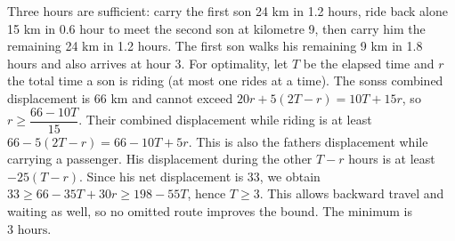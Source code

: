Three hours are sufficient: carry the first son 24 km in 1.2 hours, ride back alone 15 km in 0.6 hour to meet the second son at kilometre 9, then carry him the remaining 24 km in 1.2 hours. The first son walks his remaining 9 km in 1.8 hours and also arrives at hour 3.
For optimality, let $T$ be the elapsed time and $r$ the total time a son is riding (at most one rides at a time). The sons\textquotesingle s combined displacement is 66 km and cannot exceed $20r+5(2T-r)=10T+15r$, so $r\ge\dfrac{66-10T}{15}$. Their combined displacement while riding is at least $66-5(2T-r)=66-10T+5r$. This is also the father\textquotesingle s displacement while carrying a passenger. His displacement during the other $T-r$ hours is at least $-25(T-r)$. Since his net displacement is 33, we obtain $33\ge66-35T+30r\ge198-55T$, hence $T\ge3$. This allows backward travel and waiting as well, so no omitted route improves the bound. The minimum is $\boxed{3\text{ hours}}$.
